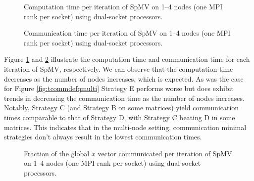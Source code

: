 \begin{figure}[H]
    \centering
    \caption{Computation time per iteration of SpMV on 1–4 nodes (one MPI rank per socket) using dual-socket  processors.}
    \label{fig:tcompdefqmpimulti}
\end{figure}

\begin{figure}[H]
    \centering
    \caption{Communication time per iteration of SpMV on 1–4 nodes (one MPI rank per socket) using dual-socket  processors.}
    \label{fig:tcommdefqmpimulti}
\end{figure}

Figure \ref{fig:tcompdefqmpimulti} and \ref{fig:tcommdefqmpimulti} illustrate the computation time and communication time for each iteration of SpMV, respectively. We can observe that the computation time decreases as the number of nodes increases, which is expected. As was the case for Figure \ref{fig:tcommdefqmulti} Strategy E performs worse but does exhibit trends in decreasing the communication time as the number of nodes increases. Notably, Strategy C (and Strategy B on some matrices) yield communication times comparable to that of Strategy D, with Strategy C beating D in some matrices. This indicates that in the multi-node setting, communication minimal strategies don't always result in the lowest communication times. 


\begin{figure}[H]
    \centering
    \caption{Fraction of the global \(x\) vector communicated per iteration of SpMV on 1–4 nodes (one MPI rank per socket) using dual-socket  processors.}
    \label{fig:commloaddefqmpimulti}
\end{figure}

